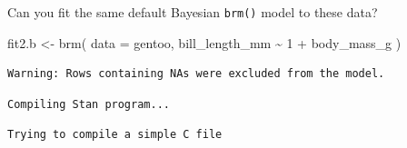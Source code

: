 \documentclass[
  letterpaper,
  DIV=11,
  numbers=noendperiod]{scrartcl}
\newenvironment{Shaded}{\begin{snugshade}}{\end{snugshade}}
\newcommand{\AttributeTok}[1]{\textcolor[rgb]{0.40,0.45,0.13}{#1}}
\newcommand{\DecValTok}[1]{\textcolor[rgb]{0.68,0.00,0.00}{#1}}
\newcommand{\FunctionTok}[1]{\textcolor[rgb]{0.28,0.35,0.67}{#1}}
\newcommand{\NormalTok}[1]{\textcolor[rgb]{0.00,0.23,0.31}{#1}}
\newcommand{\OtherTok}[1]{\textcolor[rgb]{0.00,0.23,0.31}{#1}}
\newcommand{\SpecialCharTok}[1]{\textcolor[rgb]{0.37,0.37,0.37}{#1}}
\begin{document}
Can you fit the same default Bayesian \texttt{brm()} model to these
data?

\begin{Shaded}
\begin{Highlighting}[]
\NormalTok{fit2.b }\OtherTok{\textless{}{-}} \FunctionTok{brm}\NormalTok{(}
  \AttributeTok{data =}\NormalTok{ gentoo,}
\NormalTok{  bill\_length\_mm }\SpecialCharTok{\textasciitilde{}} \DecValTok{1} \SpecialCharTok{+}\NormalTok{ body\_mass\_g}
\NormalTok{)}
\end{Highlighting}
\end{Shaded}

\begin{verbatim}
Warning: Rows containing NAs were excluded from the model.
\end{verbatim}

\begin{verbatim}
Compiling Stan program...
\end{verbatim}

\begin{verbatim}
Trying to compile a simple C file
\end{verbatim}
\end{document}
